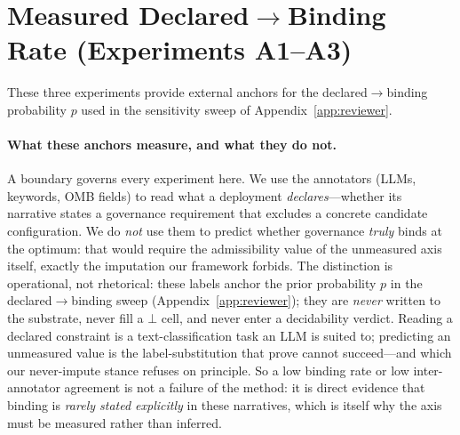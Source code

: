 \documentclass{article} %
\newcommand{\bbot}{\bot}
\begin{document}
\section{Measured Declared$\to$Binding Rate (Experiments A1--A3)}
\label{app:binding_rate}

These three experiments provide external anchors for the declared$\to$binding probability $p$ used in the sensitivity sweep of Appendix~\ref{app:reviewer}.

\paragraph{What these anchors measure, and what they do not.} A boundary governs every experiment here. We use the annotators (LLMs, keywords, OMB fields) to read what a deployment \emph{declares}---whether its narrative states a governance requirement that excludes a concrete candidate configuration. We do \emph{not} use them to predict whether governance \emph{truly} binds at the optimum: that would require the admissibility value of the unmeasured axis itself, exactly the imputation our framework forbids. The distinction is operational, not rhetorical: these labels anchor the prior probability $p$ in the declared$\to$binding sweep (Appendix~\ref{app:reviewer}); they are \emph{never} written to the substrate, never fill a $\bbot$ cell, and never enter a decidability verdict. Reading a declared constraint is a text-classification task an LLM is suited to; predicting an unmeasured value is the label-substitution that \citet{dorner2025limits} prove cannot succeed---and which our never-impute stance refuses on principle. So a low binding rate or low inter-annotator agreement is not a failure of the method: it is direct evidence that binding is \emph{rarely stated explicitly} in these narratives, which is itself why the axis must be measured rather than inferred.
\end{document}
